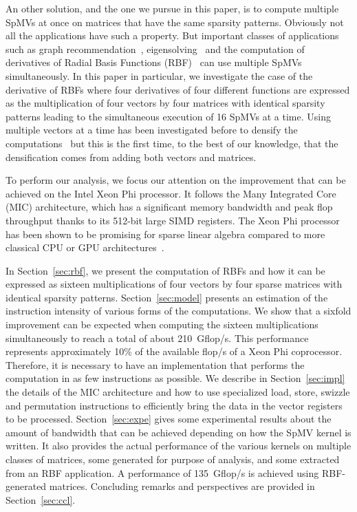 \documentclass[10pt,conference,compsocconf]{IEEEtran}
\begin{document}
An other solution, and the one we pursue in this paper, is to compute
multiple SpMVs at once on matrices that have the same sparsity
patterns. Obviously not all the applications have such a property. But
important classes of applications such as graph
recommendation~\cite{Kucuktunc13-SNAM}, eigensolving~\cite{LOBPCG} and the computation of
derivatives of Radial Basis Functions (RBF)~\cite{FLBWSC12} can use multiple
SpMVs simultaneously. In this paper in particular, we investigate the
case of the derivative of RBFs where four derivatives of four
different functions are expressed as the multiplication of four vectors
by four matrices with identical sparsity patterns leading to the
simultaneous execution of 16 SpMVs at a time. Using multiple vectors
at a time has been investigated before to densify the
computations~\cite{Im01} but this is the first time, to the 
best of our knowledge, that the
densification comes from adding both vectors and matrices.

To perform our analysis, we focus our attention on the improvement
that can be achieved on the Intel Xeon Phi processor. It follows the
Many Integrated Core (MIC) architecture, which has a significant
memory bandwidth and peak flop throughput thanks to its 512-bit large
SIMD registers. The Xeon Phi processor has been shown to be promising
for sparse linear algebra compared to more classical CPU or GPU
architectures~\cite{Saule13-ARXIV, Liu:2013:ESM:2464996.2465013, cramer2012openmp}.

In Section~\ref{sec:rbf}, we present the computation of RBFs and how it
can be expressed as sixteen multiplications of four vectors by four sparse matrices
with identical sparsity patterns. Section~\ref{sec:model} presents an
estimation of the instruction intensity of various forms of the
computations. We show that a sixfold improvement can be
expected when computing the sixteen multiplications simultaneously to
reach a total of about 210~Gflop/s. This performance represents
approximately 10\% of the available flop/s of a Xeon Phi
coprocessor. Therefore, it is necessary to have an implementation that
performs the computation in as few instructions as
possible. We describe in Section~\ref{sec:impl} the details of the MIC
architecture and how to use specialized load, store, swizzle and
permutation instructions to efficiently bring the data in the vector
registers to be processed. Section~\ref{sec:expe} gives some
experimental results about the amount of bandwidth that can be achieved
depending on how the SpMV kernel is written. It also provides the actual performance
of the various kernels on multiple classes of matrices, some generated
for purpose of analysis, and some extracted from an RBF application. A
performance of 135~Gflop/s is achieved using RBF-generated matrices. Concluding
remarks and perspectives are provided in Section~\ref{sec:ccl}.
\end{document}
